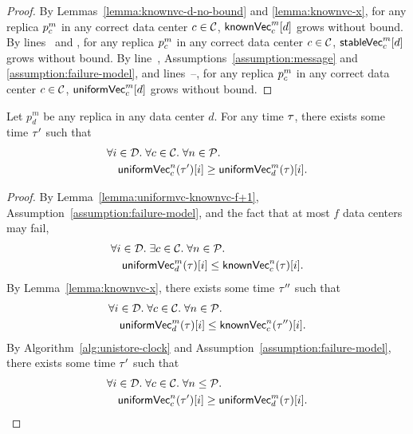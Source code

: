 \begin{proof} \label{proof:uniformvc-c-no-bound}
  By Lemmas~\ref{lemma:knownvc-d-no-bound} and \ref{lemma:knownvc-x},
  for any replica $p^{m}_{c}$
  in any correct data center $c \in \mathcal{C}$,
  ${\sf knownVec}^{m}_{c}[d]$ grows without bound.
  By lines~\code{\ref{alg:unistore-clock}}{\ref{line:bcast-call-knownvclocal}}
  and \code{\ref{alg:unistore-clock}}{\ref{line:knownvclocal-stablevc-causal}},
  for any replica $p^{m}_{c}$
  in any correct data center $c \in \mathcal{C}$,
  ${\sf stableVec}^{m}_{c}[d]$ grows without bound.
  By line~\code{\ref{alg:unistore-clock}}{\ref{line:bcast-call-stablevc}},
  Assumptions~\ref{assumption:message} and \ref{assumption:failure-model},
  and lines~\code{\ref{alg:unistore-clock}}{\ref{line:stablevc-g}}--\code{
    \ref{alg:unistore-clock}}{\ref{line:stablevc-uniformvc}},
  for any replica $p^{m}_{c}$
  in any correct data center $c \in \mathcal{C}$,
  ${\sf uniformVec}^{m}_{c}[d]$ grows without bound.
\end{proof}

\begin{applemma}[\prop{4}] \label{lemma:uniformvc-x}
  Let $p^{m}_{d}$ be any replica in any data center $d$.
  For any time $\tau$, there exists some time $\tau'$ such that
  \begin{align*}
    &\forall i \in \mathcal{D}.\; \forall c \in \mathcal{C}.\; \forall n \in \mathcal{P}. \\
      &\quad {\sf uniformVec}^{n}_{c}(\tau')[i] \ge {\sf uniformVec}^{m}_{d}(\tau)[i].
  \end{align*}
\end{applemma}

\begin{proof} \label{proof:uniformvc-x}
  By Lemma~\ref{lemma:uniformvc-knownvc-f+1},
  Assumption~\ref{assumption:failure-model}, and the fact that at most
  $f$ data centers may fail,
  \begin{align*}
    &\forall i \in \mathcal{D}.\; \exists c \in \mathcal{C}.\; \forall n \in \mathcal{P}. \\
      &\quad {\sf uniformVec}^{m}_{d}(\tau)[i] \le {\sf knownVec}^{n}_{c}(\tau)[i].
  \end{align*}
  By Lemma~\ref{lemma:knownvc-x},
  there exists some time $\tau''$ such that
  \begin{align*}
    &\forall i \in \mathcal{D}.\; \forall c \in \mathcal{C}.\; \forall n \in \mathcal{P}. \\
      &\quad {\sf uniformVec}^{m}_{d}(\tau)[i] \le {\sf knownVec}^{n}_{c}(\tau'')[i].
  \end{align*}
  By Algorithm~\ref{alg:unistore-clock} and Assumption~\ref{assumption:failure-model},
  there exists some time $\tau'$ such that
  \begin{align*}
    &\forall i \in \mathcal{D}.\; \forall c \in \mathcal{C}.\; \forall n \le \mathcal{P}. \\
      &\quad {\sf uniformVec}^{n}_{c}(\tau')[i] \ge {\sf uniformVec}^{m}_{d}(\tau)[i].
  \end{align*}
\end{proof}

